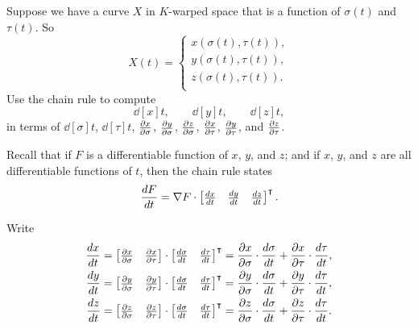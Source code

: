 \documentclass{ximera}
\begin{document}
\begin{problem}
Suppose we have a curve $X$ in $K$-warped space that is a function of
$\sigma(t)$ and $\tau(t)$. So
\[
X(t) =
\begin{cases}
  x(\sigma(t),\tau(t)),\\
  y(\sigma(t),\tau(t)),\\
  z(\sigma(t),\tau(t)).\\
\end{cases}
\]
Use the chain rule to compute
\[
\dd[x]{t},\qquad \dd[y]{t}, \qquad \dd[z]{t},
\]
in terms of $\dd[\sigma]{t}$, $\dd[\tau]{t}$, $\pp[x]{\sigma}$,
$\pp[y]{\sigma}$, $\pp[z]{\sigma}$, $\pp[x]{\tau}$, $\pp[y]{\tau}$,
and $\pp[z]{\tau}$.
\begin{hint}
  Recall that if $F$ is a differentiable function of $x$, $y$, and
  $z$; and if $x$, $y$, and $z$ are all differentiable functions of
  $t$, then the chain rule states
  \[
  \dd[F]{t} = \nabla F \cdot
  \begin{bmatrix}
    \dd[x]{t} & \dd[y]{t} & \dd[z]{t}
  \end{bmatrix}^\transpose
  .
  \]
\end{hint}
\begin{freeResponse}
  Write
  \begin{align*}
    \dd[x]{t} &= \begin{bmatrix}\pp[x]{\sigma} & \pp[x]{\tau}\end{bmatrix}\cdot\begin{bmatrix}\dd[\sigma]{t} & \dd[\tau]{t}\end{bmatrix}^\transpose = \pp[x]{\sigma}\cdot\dd[\sigma]{t}+\pp[x]{\tau}\cdot\dd[\tau]{t}, \\
    \dd[y]{t} &= \begin{bmatrix}\pp[y]{\sigma} & \pp[y]{\tau}\end{bmatrix}\cdot\begin{bmatrix}\dd[\sigma]{t} & \dd[\tau]{t}\end{bmatrix}^\transpose = \pp[y]{\sigma}\cdot\dd[\sigma]{t}+\pp[y]{\tau}\cdot\dd[\tau]{t}, \\
    \dd[z]{t} &= \begin{bmatrix}\pp[z]{\sigma} & \pp[z]{\tau}\end{bmatrix}\cdot\begin{bmatrix}\dd[\sigma]{t} & \dd[\tau]{t}\end{bmatrix}^\transpose = \pp[z]{\sigma}\cdot\dd[\sigma]{t}+\pp[z]{\tau}\cdot\dd[\tau]{t}.  
  \end{align*}
\end{freeResponse}
\end{problem}
\end{document}
